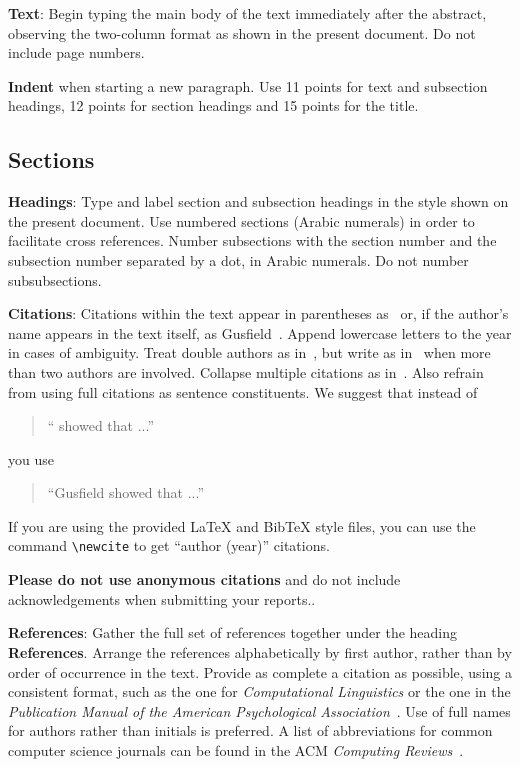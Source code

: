 \documentclass[11pt]{article}
\begin{document}
{\bf Text}: Begin typing the main body of the text immediately after
the abstract, observing the two-column format as shown in 
the present document. Do not include page numbers.

{\bf Indent} when starting a new paragraph. Use 11 points for text and 
subsection headings, 12 points for section headings and 15 points for
the title. 

\subsection{Sections}

{\bf Headings}: Type and label section and subsection headings in the
style shown on the present document.  Use numbered sections (Arabic
numerals) in order to facilitate cross references. Number subsections
with the section number and the subsection number separated by a dot,
in Arabic numerals. Do not number subsubsections.

{\bf Citations}: Citations within the text appear in parentheses
as~\cite{Gusfield:97} or, if the author's name appears in the text
itself, as Gusfield~.  Append lowercase letters
to the year in cases of ambiguity.  Treat double authors as
in~\cite{Aho:72}, but write as in~\cite{Chandra:81} when more than two
authors are involved. Collapse multiple citations as
in~\cite{Gusfield:97,Aho:72}. Also refrain from using full citations
as sentence constituents. We suggest that instead of
\begin{quote}
  ``\cite{Gusfield:97} showed that ...''
\end{quote}
you use
\begin{quote}
``Gusfield    showed that ...''
\end{quote}

If you are using the provided \LaTeX{} and Bib\TeX{} style files, you
can use the command \verb|\newcite| to get ``author (year)'' citations.

\textbf{Please do not use anonymous citations} and do not include
acknowledgements when submitting your reports..

\textbf{References}: Gather the full set of references together under
the heading {\bf References}. Arrange the references alphabetically
by first author, rather than by order of occurrence in the text.
Provide as complete a citation as possible, using a consistent format,
such as the one for {\em Computational Linguistics\/} or the one in the 
{\em Publication Manual of the American 
Psychological Association\/}~\cite{APA:83}.  Use of full names for
authors rather than initials is preferred.  A list of abbreviations
for common computer science journals can be found in the ACM 
{\em Computing Reviews\/}~\cite{ACM:83}.
\end{document}
